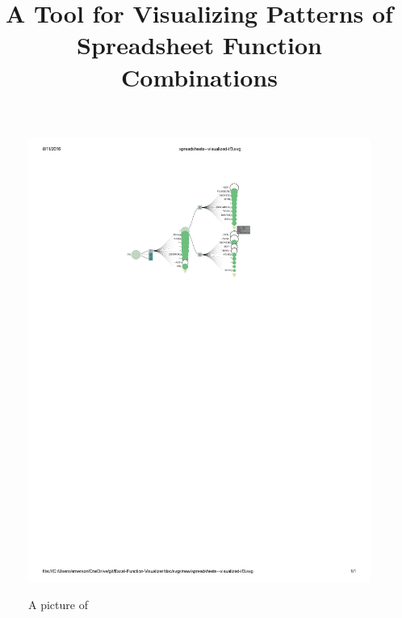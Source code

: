 \documentclass[conference]{IEEEtran}
\begin{document}
	\title{A Tool for Visualizing Patterns of Spreadsheet Function Combinations}
	
	
	\author{ 
		 }
	
	
	\maketitle
	
	\begin{figure}[t] \includegraphics[width = \textwidth]{IFargslabel} \caption{A
			picture of \toolname} \centering \label{fig:fullpic} \end{figure}
	
\end{document}

